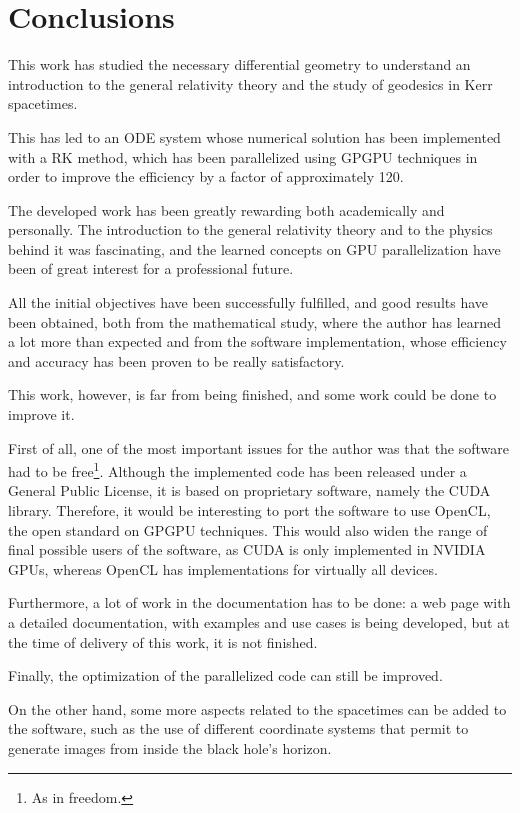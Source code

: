 \chapter*{Conclusions}

This work has studied the necessary differential geometry to understand an introduction to the general relativity theory and the study of geodesics in Kerr spacetimes.

This has led to an \ac{ODE} system whose numerical solution has been implemented with a \ac{RK} method, which has been parallelized using \ac{GPGPU} techniques in order to improve the efficiency by a factor of approximately 120.

The developed work has been greatly rewarding both academically and personally. The introduction to the general relativity theory and to the physics behind it was fascinating, and the learned concepts on \ac{GPU} parallelization have been of great interest for a professional future.

All the initial objectives have been successfully fulfilled, and good results have been obtained, both from the mathematical study, where the author has learned a lot more than expected and from the software implementation, whose efficiency and accuracy has been proven to be really satisfactory.

This work, however, is far from being finished, and some work could be done to improve it.

First of all, one of the most important issues for the author was that the software had to be free\footnote{As in freedom.}. Although the implemented code has been released under a General Public License, it is based on proprietary software, namely the \ac{CUDA} library. Therefore, it would be interesting to port the software to use OpenCL, the open standard on \ac{GPGPU} techniques. This would also widen the range of final possible users of the software, as \ac{CUDA} is only implemented in NVIDIA \acp{GPU}, whereas OpenCL has implementations for virtually all devices.

Furthermore, a lot of work in the documentation has to be done: a web page with a detailed documentation, with examples and use cases is being developed, but at the time of delivery of this work, it is not finished.

Finally, the optimization of the parallelized code can still be improved.

On the other hand, some more aspects related to the spacetimes can be added to the software, such as the use of different coordinate systems that permit to generate images from inside the black hole's horizon.